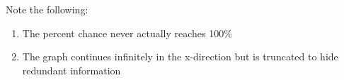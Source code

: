\documentclass{article}
\begin{document}
Note the following:
\begin{enumerate}
    \item The percent chance never actually reaches 100\%
    \item The graph continues infinitely in the x-direction but is truncated to hide redundant information
\end{enumerate}
\end{document}
